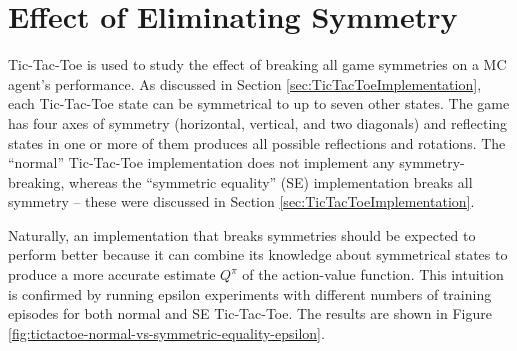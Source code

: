 \documentclass[11pt,a4paper,twoside,openright]{report}
\begin{document}
\newpage


\section{Effect of Eliminating Symmetry}
\label{sec:eliminate-symmetry}

Tic-Tac-Toe is used to study the effect of breaking all game symmetries on a MC agent's performance. As discussed in Section \ref{sec:TicTacToeImplementation}, each Tic-Tac-Toe state can be symmetrical to up to seven other states. The game has four axes of symmetry (horizontal, vertical, and two diagonals) and reflecting states in one or more of them produces all possible reflections and rotations. The ``normal'' Tic-Tac-Toe implementation does not implement any symmetry-breaking, whereas the ``symmetric equality'' (SE) implementation breaks all symmetry -- these were discussed in Section \ref{sec:TicTacToeImplementation}.

Naturally, an implementation that breaks symmetries should be expected to perform better because it can combine its knowledge about symmetrical states to produce a more accurate estimate $Q^{\pi}$ of the action-value function. This intuition is confirmed by running epsilon experiments with different numbers of training episodes for both normal and SE Tic-Tac-Toe. The results are shown in Figure \ref{fig:tictactoe-normal-vs-symmetric-equality-epsilon}.
\end{document}

